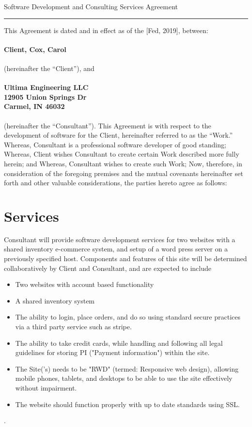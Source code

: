 \documentclass[10pt]{article}
\begin{document}
\begin{center}
{\Large Software Development and Consulting Services Agreement}
\end{center}

\hrule height .1mm

\vspace{.5cm}

\noindent This Agreement is dated and in effect as of the [Fed, 2019], between:\\
\\
{\bf Client, Cox, Carol \\}
\\
(hereinafter the ``Client''), and\\
\\
{\bf Ultima Engineering LLC\\
12905 Union Springs Dr\\
Carmel, IN 46032\\}
\\
(hereinafter the ``Consultant'').  This Agreement is with respect to the
development of software for the Client, hereinafter referred to as the
``Work.''   Whereas, Consultant is a professional software developer of good
standing; Whereas, Client wishes Consultant to create certain Work described
more fully herein; and Whereas, Consultant wishes to create such Work; Now,
therefore, in consideration of the foregoing premises and the mutual
covenants hereinafter set forth and other valuable considerations, the
parties hereto agree as follows: 


\section{Services}

Consultant will provide software development services for two websites with a shared inventory e-commerce system, and setup of a word press server on a previously specified host.  Components and features of this site will
be determined collaboratively by Client and Consultant, and are expected to
include 
\begin{itemize}
	\item Two websites with account based functionality
	\item A shared inventory system
	\item The ability to login, place orders, and do so using standard secure practices via a third party service such as stripe.
	\item The ability to take credit cards, while handling and following all legal guidelines for storing PI ("Payment information") within the site.
	\item The Site('s) needs to be "RWD" (termed: Responsive web design), allowing mobile phones, tablets, and desktops to be able to use the site effectively without impairment. 
	\item The website should function properly with up to date standards using SSL. 
\end{itemize}.
\end{document}
